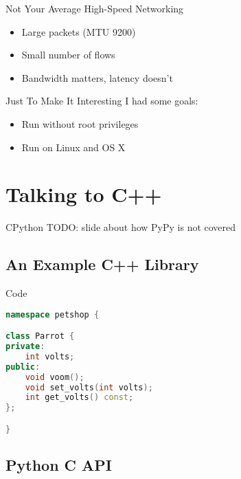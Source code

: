 \documentclass{beamer}
\begin{document}
\begin{frame}{Not Your Average High-Speed Networking}
  \begin{itemize}
    \item Large packets (MTU 9200)
    \item Small number of flows
    \item Bandwidth matters, latency doesn't
  \end{itemize}
\end{frame}

\begin{frame}{Just To Make It Interesting}
  I had some goals:
  \begin{itemize}
    \item Run without root privileges
    \item Run on Linux and OS X
  \end{itemize}
\end{frame}

\section{Talking to C++}

\begin{frame}{CPython}
  TODO: slide about how PyPy is not covered
\end{frame}

\subsection{An Example C++ Library}

\begin{frame}[fragile=singleslide]{Code}
\begin{lstlisting}[language=c++]
namespace petshop {

class Parrot {
private:
    int volts;
public:
    void voom();
    void set_volts(int volts);
    int get_volts() const;
};

}
\end{lstlisting}
\end{frame}

\subsection{Python C API}
\end{document}
